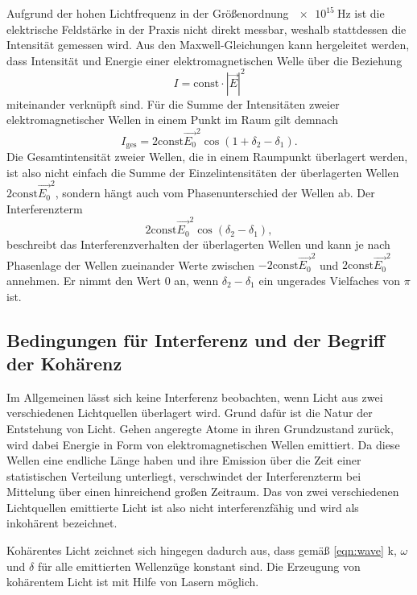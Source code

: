 Aufgrund der hohen Lichtfrequenz in der Größenordnung $\SI{e15}{\hertz}$ ist die elektrische Feldstärke in der Praxis
nicht direkt messbar, weshalb stattdessen die Intensität gemessen wird. Aus den Maxwell-Gleichungen kann hergeleitet 
werden, dass Intensität und Energie einer elektromagnetischen Welle über die Beziehung 
\begin{equation}
    I = \text{const} \cdot |\vec{E}|^2
\end{equation}
miteinander verknüpft sind. Für die Summe der Intensitäten zweier elektromagnetischer Wellen in einem Punkt im Raum
gilt demnach
\begin{equation}
    I_\text{ges} = 2 \text{const} \vec{E_0}^2 \cos\left(1 + \delta_2 - \delta_1\right) .
\end{equation}
Die Gesamtintensität zweier Wellen, die in einem Raumpunkt überlagert werden, ist also nicht einfach die Summe der Einzelintensitäten der 
überlagerten Wellen $2 \text{const} \vec{E_0}^2$, sondern hängt auch vom Phasenunterschied der Wellen ab. 
Der Interferenzterm
\begin{equation}
    2 \text{const} \vec{E_0}^2 \cos\left(\delta_2 - \delta_1\right), 
\end{equation}
beschreibt das Interferenzverhalten der überlagerten Wellen und kann je nach Phasenlage der Wellen zueinander Werte 
zwischen $ -2 \text{const} \vec{E_0}^2$ und $2 \text{const} \vec{E_0}^2$ annehmen. 
Er nimmt den Wert 0 an, wenn $\delta_2 - \delta_1$ ein ungerades Vielfaches von $\pi$ ist. 

\subsection{Bedingungen für Interferenz und der Begriff der Kohärenz}
\label{ssec:kohärenz}

Im Allgemeinen lässt sich keine Interferenz beobachten, wenn Licht aus zwei verschiedenen Lichtquellen überlagert wird.
Grund dafür ist die Natur der Entstehung von Licht. Gehen angeregte Atome in ihren Grundzustand zurück, wird dabei Energie in 
Form von elektromagnetischen Wellen emittiert. Da diese Wellen eine endliche Länge haben und ihre Emission über die Zeit
einer statistischen Verteilung unterliegt, verschwindet der Interferenzterm bei Mittelung über einen hinreichend großen 
Zeitraum. Das von zwei verschiedenen Lichtquellen emittierte Licht ist also nicht interferenzfähig und wird als
inkohärent bezeichnet. 

Kohärentes Licht zeichnet sich hingegen dadurch aus, dass gemäß \autoref{eqn:wave} k, $\omega$ und $\delta$ für alle emittierten Wellenzüge
konstant sind. Die Erzeugung von kohärentem Licht ist mit Hilfe von Lasern möglich. 

